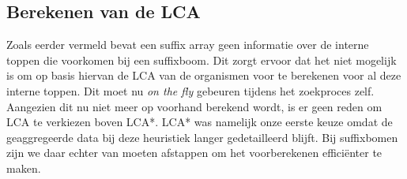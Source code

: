 \subsection{Berekenen van de LCA}\label{subsec:berekenen-van-de-lca}
Zoals eerder vermeld bevat een suffix array geen informatie over de interne toppen die voorkomen bij een suffixboom.
Dit zorgt ervoor dat het niet mogelijk is om op basis hiervan de LCA van de organismen voor te berekenen voor al deze interne toppen.
Dit moet nu \textit{on the fly} gebeuren tijdens het zoekproces zelf.
Aangezien dit nu niet meer op voorhand berekend wordt, is er geen reden om LCA te verkiezen boven LCA*.
LCA* was namelijk onze eerste keuze omdat de geaggregeerde data bij deze heuristiek langer gedetailleerd blijft.
Bij suffixbomen zijn we daar echter van moeten afstappen om het voorberekenen efficiënter te maken.



